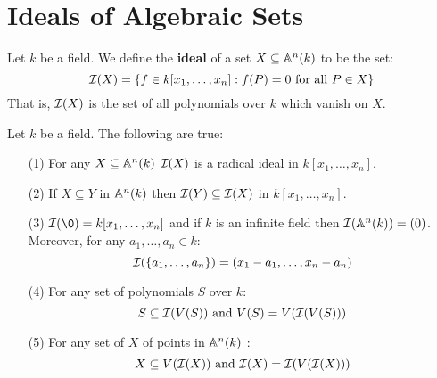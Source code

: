 \section{Ideals of Algebraic Sets}\label{section_1.2}

\begin{definition}
  Let $k$ be a field. We define the  \textbf{ideal} of a set $X
  \subseteq \mathbb{A}^n(k)$ to be the set:
  \begin{equation*}
    \mathcal{I}(X)=\{ f \in k[x_1, \dots, x_n] : f(P)=0 \text{ for all } P \in X \}
  \end{equation*}
  That is, $\mathcal{I}(X)$ is the set of all polynomials over $k$ which
  vanish on $X$.
\end{definition}

\begin{proposition}\label{proposition_10.2.1}
  Let $k$ be a field. The following are true:
  \begin{enumerate}
    \item[(1)] For any $X \subseteq \mathbb{A}^n(k)$ $\mathcal{I}(X)$ is a radical
      ideal in $k[x_1, \dots, x_n]$.

    \item[(2)] If $X \subseteq Y$ in $\mathbb{A}^n(k)$ then $\mathcal{I}(Y) \subseteq
      \mathcal{I}(X)$ in $k[x_1, \dots, x_n]$.

    \item[(3)] $\Ic(\0)=k[x_1, \dots, x_n]$ and if $k$ is an infinite
      field then $\mathcal{I}(\mathbb{A}^n(k))=(0)$. Moreover, for any $a_1, \dots,
      a_n \in k$:
      \begin{equation*}
        \mathcal{I}(\{a_1, \dots, a_n\})=(x_1-a_1, \dots, x_n-a_n)
      \end{equation*}

    \item[(4)] For any set of polynomials $S$ over $k$:
      \begin{equation*}
        S \subseteq \mathcal{I}(V(S)) \text{ and } V(S)=V(\mathcal{I}(V(S)))
      \end{equation*}

    \item[(5)] For any set of $X$ of points in $\mathbb{A}^n(k)$ :
      \begin{equation*}
        X \subseteq V(\mathcal{I}(X)) \text{ and } \mathcal{I}(X)=\mathcal{I}(V(\mathcal{I}(X)))
      \end{equation*}
  \end{enumerate}
\end{proposition}
